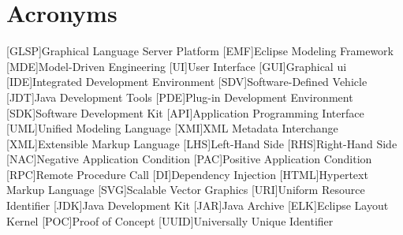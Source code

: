 \newpage
\section{Acronyms}
\label{sec:acronyms}
\begin{acronym}
    [GLSP]{Graphical Language Server Platform}
    [EMF]{Eclipse Modeling Framework}
    [MDE]{Model-Driven Engineering}
    [UI]{User Interface}
    [GUI]{Graphical \acf{ui}}
    [IDE]{Integrated Development Environment}
    [SDV]{Software-Defined Vehicle}
    [JDT]{Java Development Tools}
    [PDE]{Plug-in Development Environment}
    [SDK]{Software Development Kit}
    [API]{Application Programming Interface}
    [UML]{Unified Modeling Language}
    [XMI]{XML Metadata Interchange}
    [XML]{Extensible Markup Language}
    [LHS]{Left-Hand Side}
    [RHS]{Right-Hand Side}
    [NAC]{Negative Application Condition}
    [PAC]{Positive Application Condition}
    [RPC]{Remote Procedure Call}
    [DI]{Dependency Injection}
    [HTML]{Hypertext Markup Language}
    [SVG]{Scalable Vector Graphics}
    [URI]{Uniform Resource Identifier}
    [JDK]{Java Development Kit}
    [JAR]{Java Archive}
    [ELK]{Eclipse Layout Kernel}
    [POC]{Proof of Concept}
    [UUID]{Universally Unique Identifier}
  \end{acronym}